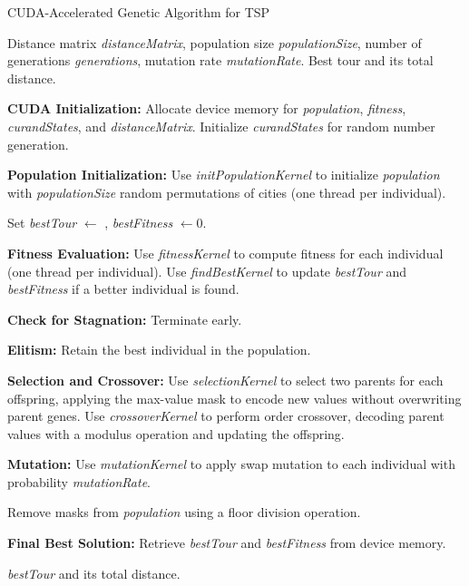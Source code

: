 \documentclass[conference]{IEEEtran}
\begin{document}
\begin{algorithm}
\caption{CUDA-Accelerated Genetic Algorithm for TSP}
\label{alg:cuda_genetic_algorithm}
\begin{algorithmic}[1]
\REQUIRE Distance matrix \textit{distanceMatrix}, population size \textit{populationSize}, number of generations \textit{generations}, mutation rate \textit{mutationRate}.
\ENSURE Best tour and its total distance.

\STATE \textbf{CUDA Initialization:}
\STATE Allocate device memory for \textit{population}, \textit{fitness}, \textit{curandStates}, and \textit{distanceMatrix}.
\STATE Initialize \textit{curandStates} for random number generation.

\STATE \textbf{Population Initialization:}
\STATE Use \textit{initPopulationKernel} to initialize \textit{population} with \textit{populationSize} random permutations of cities (one thread per individual).

\STATE Set \textit{bestTour} $\leftarrow$ , \textit{bestFitness} $\leftarrow 0$.

    \STATE \textbf{Fitness Evaluation:}
    \STATE Use \textit{fitnessKernel} to compute fitness for each individual (one thread per individual).
    \STATE Use \textit{findBestKernel} to update \textit{bestTour} and \textit{bestFitness} if a better individual is found.

    \STATE \textbf{Check for Stagnation:}
        \STATE Terminate early.
    \ENDIF

    \STATE \textbf{Elitism:} Retain the best individual in the population.

    \STATE \textbf{Selection and Crossover:}
    \STATE Use \textit{selectionKernel} to select two parents for each offspring, applying the max-value mask to encode new values without overwriting parent genes.
    \STATE Use \textit{crossoverKernel} to perform order crossover, decoding parent values with a modulus operation and updating the offspring.

    \STATE \textbf{Mutation:}
    \STATE Use \textit{mutationKernel} to apply swap mutation to each individual with probability \textit{mutationRate}.

    \STATE Remove masks from \textit{population} using a floor division operation.
\ENDFOR

\STATE \textbf{Final Best Solution:}
\STATE Retrieve \textit{bestTour} and \textit{bestFitness} from device memory.

\RETURN \textit{bestTour} and its total distance.
\end{algorithmic}
\end{algorithm}
\end{document}
